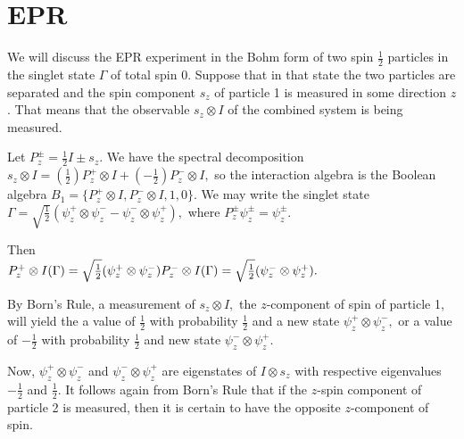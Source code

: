 \documentclass{article}
\begin{document}
\section*{EPR}
We will discuss the EPR experiment in the Bohm form of two spin $\frac{1}{2}$ particles in the singlet state $\Gamma$ of total spin 0. Suppose that in that state the two particles are separated and the spin component $s_z$ of particle 1 is measured in some direction $z$. That means that the observable $s_z\otimes I$ of the combined system is being measured. 

 Let $P_z^\pm  = \frac{1}{2} I \pm s_z.$ We have the spectral decomposition $s_z\otimes I = (\frac{1}{2})P^+_z\otimes I + (-\frac{1}{2})P_z^-\otimes I,$                                                                                                                                                                                            so the interaction algebra is the Boolean algebra $B_1 = \{ P_z^+\otimes I, P_z^-\otimes I,1,0\}.$                                                                                                                                                                                                                               We may write the singlet state $\Gamma = \sqrt{\frac{1}{2}}(\psi^+_z\otimes \psi^-_z - \psi_z^- \otimes \psi_z^+),$ where $P_z^\pm \psi_z^\pm = \psi_z^\pm.$
 

Then  \\   $P_z^+\otimes I(\Gamma) = \sqrt{\frac{1}{2}} (\psi_z^+\otimes \psi_z^-)\\                                                                                                                                                                                                                                                                                                                        P_z^-\otimes I(\Gamma) = \sqrt{\frac{1}{2}} (\psi_z^- \otimes \psi_z^+).$

By Born's Rule, a measurement of $s_z\otimes I,$ the $z$-component of spin of particle 1, will yield the a value of $\frac{1}{2}$ with probability $\frac{1}{2}$ and a new state $\psi_z^+\otimes \psi_z^-,$ or a value of  $-\frac{1}{2}$ with probability $\frac{1}{2}$  and new state  $\psi_z^-\otimes \psi_z^+.$

                                                                                                                                                                                                  Now,  $\psi_z^+\otimes \psi_z^-$ and $\psi_z^-\otimes \psi_z^+$ are eigenstates of $I\otimes s_z$ with respective eigenvalues  $-\frac{1}{2}$ and $\frac{1}{2}$. It follows again from Born's Rule that if the $z$-spin component of particle 2 is measured, then it is certain to have the opposite $z$-component of spin.     
                                                                                                                                                                                       
\end{document}
